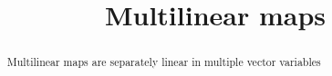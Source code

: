 \documentclass{ximera}
\title{Multilinear maps}
\begin{document}
	\begin{abstract}
		Multilinear maps are separately linear in multiple vector variables 
	\end{abstract}
\end{document}
